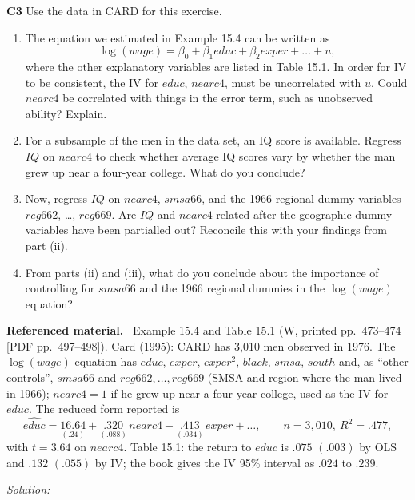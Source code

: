 \documentclass[11pt,a4paper]{article}
\newif\ifsolucoes
\newcommand{\espacoresol}{4.5cm}   %
\newenvironment{refmaterial}{\par\smallskip\noindent\begingroup\small\textbf{Referenced material.}~}{\endgroup\par\smallskip}
\newcommand{\resolespaco}{\ifsolucoes\else\par\textit{Solution:}\vspace{\espacoresol}\par\fi}
\begin{document}
\noindent\textbf{C3} Use the data in CARD for this exercise.
\begin{enumerate}[label=(\roman*)]
\item The equation we estimated in Example 15.4 can be written as
\[\log(wage)=\beta_0+\beta_1educ+\beta_2exper+\dots+u,\]
where the other explanatory variables are listed in Table 15.1. In order for IV to be consistent, the IV
for $educ$, $nearc4$, must be uncorrelated with $u$. Could $nearc4$ be correlated with things in the error
term, such as unobserved ability? Explain.
\item For a subsample of the men in the data set, an IQ score is available. Regress $IQ$ on $nearc4$ to
check whether average IQ scores vary by whether the man grew up near a four-year college. What do you conclude?
\item Now, regress $IQ$ on $nearc4$, $smsa66$, and the 1966 regional dummy variables $reg662$, \dots,
$reg669$. Are $IQ$ and $nearc4$ related after the geographic dummy variables have been partialled out?
Reconcile this with your findings from part (ii).
\item From parts (ii) and (iii), what do you conclude about the importance of controlling for $smsa66$ and
the 1966 regional dummies in the $\log(wage)$ equation?
\end{enumerate}
\begin{refmaterial}
Example 15.4 and Table 15.1 (W, printed pp.~473--474 [PDF pp.~497--498]). Card (1995): CARD has 3,010 men
observed in 1976. The $\log(wage)$ equation has $educ$, $exper$, $exper^2$, $black$, $smsa$, $south$ and,
as ``other controls'', $smsa66$ and $reg662,\dots,reg669$ (SMSA and region where the man lived in 1966);
$nearc4=1$ if he grew up near a four-year college, used as the IV for $educ$. The reduced form reported is
\[
\widehat{educ}=\underset{(.24)}{16.64}+\underset{(.088)}{.320}\,nearc4-\underset{(.034)}{.413}\,exper+\dots,\qquad n=3{,}010,\ R^2=.477,
\]
with $t=3.64$ on $nearc4$. Table 15.1: the return to $educ$ is $.075$ $(.003)$ by OLS and $.132$ $(.055)$ by
IV; the book gives the IV 95\% interval as $.024$ to $.239$.
\end{refmaterial}
\resolespaco
\end{document}
